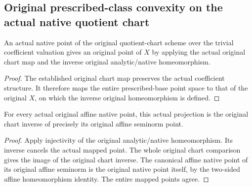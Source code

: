 \subsection{Original prescribed-class convexity on the actual native quotient chart}

\begin{definition}
\label{projective:actual-admissible-analytic-projection}
\leanok
{}
An actual native point of the original quotient-chart scheme over the trivial
coefficient valuation gives an original point of $X$ by applying the actual
original chart map and the inverse original analytic/native homeomorphism.
\end{definition}
\begin{proof}
The established original chart map preserves the actual coefficient structure.
It therefore maps the entire prescribed-base point space to that of the
original $X$, on which the inverse original homeomorphism is defined.
\end{proof}

\begin{lemma}
\label{projective:actual-admissible-projection-chart-inverse}
\leanok
{}
For every actual original affine native point, this actual projection is the
original chart inverse of precisely its original affine seminorm point.
\end{lemma}
\begin{proof}
Apply injectivity of the original analytic/native homeomorphism. Its inverse
cancels the actual mapped point. The whole original chart comparison gives
the image of the original chart inverse. The canonical affine native point
of its original affine seminorm is the original native point itself, by the
two-sided affine homeomorphism identity. The entire mapped points agree.
\end{proof}

